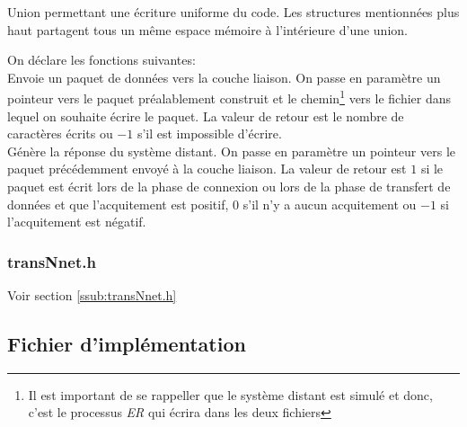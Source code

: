 \documentclass[11pt,french]{article}
\begin{document}
                
                Union permettant une écriture uniforme du code. Les structures mentionnées plus haut partagent tous un même espace mémoire à 
                l'intérieure d'une union.
                
                \vspace{0.5cm}

                On déclare les fonctions suivantes:\\
                
                Envoie un paquet de données vers la couche liaison. On passe en paramètre un pointeur vers le paquet préalablement construit et le 
                chemin\footnote{Il est important de se rappeller que le système distant est simulé et donc, c'est le processus \emph{ER} qui écrira 
                dans les deux fichiers} vers le fichier dans lequel on souhaite écrire le paquet. La valeur de retour est le nombre de caractères
                écrits ou $-1$ s'il est impossible d'écrire.\\

                
                Génère la réponse du système distant. On passe en paramètre un pointeur vers le paquet précédemment envoyé à la couche liaison. La valeur
                de retour est $1$ si le paquet est écrit lors de la phase de connexion ou lors de la phase de transfert de données et que 
                l'acquitement est positif, $0$ s'il n'y a aucun acquitement ou $-1$ si l'acquitement est négatif.
            \subsubsection{transNnet.h} %
            \label{ssub:transNnet.h-net}
                Voir section {\color{blue} \ref{ssub:transNnet.h}}
        \subsection{Fichier d'implémentation} %
        \label{sub:fich-implementation-network-entity}
\end{document}
